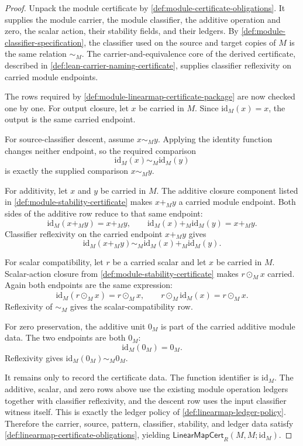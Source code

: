 \begin{proof}
Unpack the module certificate by \autoref{def:module-certificate-obligations}. It supplies the module carrier, the module classifier, the additive operation and zero, the scalar action, their stability fields, and their ledgers. By \autoref{def:module-classifier-specification}, the classifier used on the source and target copies of $M$ is the same relation $\sim_M$. The carrier-and-equivalence core of the derived certificate, described in \autoref{def:lean-carrier-naming-certificate}, supplies classifier reflexivity on carried module endpoints.

The rows required by \autoref{def:module-linearmap-certificate-package} are now checked one by one. For output closure, let $x$ be carried in $M$. Since $\mathrm{id}_M(x)=x$, the output is the same carried endpoint.

For source-classifier descent, assume $x\sim_M y$. Applying the identity function changes neither endpoint, so the required comparison
$$
\mathrm{id}_M(x)\sim_M\mathrm{id}_M(y)
$$
is exactly the supplied comparison $x\sim_M y$.

For additivity, let $x$ and $y$ be carried in $M$. The additive closure component listed in \autoref{def:module-stability-certificate} makes $x+_M y$ a carried module endpoint. Both sides of the additive row reduce to that same endpoint:
$$
\mathrm{id}_M(x+_M y)=x+_M y,
\qquad
\mathrm{id}_M(x)+_M\mathrm{id}_M(y)=x+_M y.
$$
Classifier reflexivity on the carried endpoint $x+_M y$ gives
$$
\mathrm{id}_M(x+_M y)\sim_M\mathrm{id}_M(x)+_M\mathrm{id}_M(y).
$$

For scalar compatibility, let $r$ be a carried scalar and let $x$ be carried in $M$. Scalar-action closure from \autoref{def:module-stability-certificate} makes $r\odot_M x$ carried. Again both endpoints are the same expression:
$$
\mathrm{id}_M(r\odot_M x)=r\odot_M x,
\qquad
r\odot_M\mathrm{id}_M(x)=r\odot_M x.
$$
Reflexivity of $\sim_M$ gives the scalar-compatibility row.

For zero preservation, the additive unit $0_M$ is part of the carried additive module data. The two endpoints are both $0_M$:
$$
\mathrm{id}_M(0_M)=0_M.
$$
Reflexivity gives $\mathrm{id}_M(0_M)\sim_M0_M$.

It remains only to record the certificate data. The function identifier is $\mathrm{id}_M$. The additive, scalar, and zero rows above use the existing module operation ledgers together with classifier reflexivity, and the descent row uses the input classifier witness itself. This is exactly the ledger policy of \autoref{def:linearmap-ledger-policy}. Therefore the carrier, source, pattern, classifier, stability, and ledger data satisfy \autoref{def:linearmap-certificate-obligations}, yielding $\mathsf{LinearMapCert}_R(M,M;\mathrm{id}_M)$.
\end{proof}

